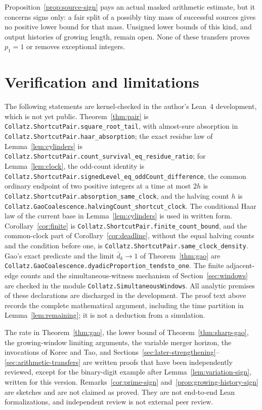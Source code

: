 \documentclass[11pt]{amsart}
\theoremstyle{definition}
\theoremstyle{remark}
\begin{document}
Proposition~\ref{prop:source-sign} pays an actual masked arithmetic estimate, but it concerns signs only: a fair split of a possibly tiny mass of successful sources gives no positive lower bound for that mass. Unsigned lower bounds of this kind, and output histories of growing length, remain open. None of these transfers proves $p_1=1$ or removes exceptional integers.

\section{Verification and limitations}\label{sec:verification}
The following statements are kernel-checked in the author's Lean~4 development, which is not yet public. Theorem~\ref{thm:pair} is \nolinkurl{Collatz.ShortcutPair.square_root_tail}, with almost-sure absorption in \nolinkurl{Collatz.ShortcutPair.haar_absorption}; the exact residue law of Lemma~\ref{lem:cylinders} is \nolinkurl{Collatz.ShortcutPair.count_survival_eq_residue_ratio}; for Lemma~\ref{lem:clock}, the odd-count identity is \nolinkurl{Collatz.ShortcutPair.signedLevel_eq_oddCount_difference}, the common ordinary endpoint of two positive integers at a time at most $2h$ is \nolinkurl{Collatz.ShortcutPair.absorption_same_clock}, and the halving count $h$ is \nolinkurl{Collatz.GaoCoalescence.halvingCount_shortcut_clock}. The conditional Haar law of the current base in Lemma~\ref{lem:cylinders} is used in written form. Corollary~\ref{cor:finite} is \nolinkurl{Collatz.ShortcutPair.finite_count_bound}, and the common-clock part of Corollary~\ref{cor:deadline}, without the equal halving counts and the condition before one, is \nolinkurl{Collatz.ShortcutPair.same_clock_density}. Gao's exact predicate and the limit $\bar d_k\to1$ of Theorem~\ref{thm:gao} are \nolinkurl{Collatz.GaoCoalescence.dyadicProportion_tendsto_one}. The finite adjacent-edge counts and the simultaneous-witness mechanism of Section~\ref{sec:windows} are checked in the module \nolinkurl{Collatz.SimultaneousWindows}. All analytic premises of these declarations are discharged in the development. The proof text above records the complete mathematical argument, including the time partition in Lemma~\ref{lem:remaining}; it is not a deduction from a simulation.

The rate in Theorem~\ref{thm:gao}, the lower bound of Theorem~\ref{thm:sharp-gao}, the growing-window limiting arguments, the variable merger horizon, the invocations of Korec and Tao, and Sections~\ref{sec:later-strengthening}--\ref{sec:arithmetic-transfers} are written proofs that have been independently reviewed, except for the binary-digit example after Lemma~\ref{lem:variation-sign}, written for this version. Remarks~\ref{cor:prime-sign} and~\ref{prop:growing-history-sign} are sketches and are not claimed as proved. They are not end-to-end Lean formalizations, and independent review is not external peer review.
\end{document}
